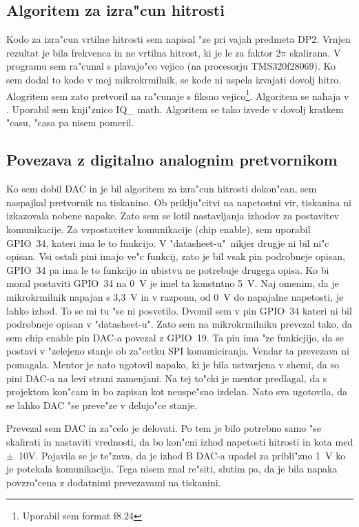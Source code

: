 \documentclass[a4paper]{article}
\begin{document}
\subsection{Algoritem za izra"cun hitrosti}  

Kodo za izra"cun vrtilne hitrosti sem napisal "ze pri vajah predmeta DP2. Vrnjen rezultat je bila frekvenca in ne vrtilna hitrost, ki je le za faktor 2$\mathrm{\pi}$ skalirana. V programu sem ra"cunal s plavajo"co vejico (na procesorju TMS320f28069). Ko sem dodal to kodo v moj mikrokrmilnik, se  kode ni uspela izvajati dovolj hitro. Alogritem sem zato pretvoril na ra"cunaje s fiksno vejico\footnote{Uporabil sem format f8.24}. Algoritem se nahaja v . Uporabil sem knji"znico IQ\_ math. Algoritem  se tako izvede v dovolj kratkem "casu, "casa pa nisem pomeril.


\subsection{Povezava z digitalno analognim pretvornikom}

Ko sem dobil DAC in je bil algoritem za  izra"cun hitrosti dokon"can, sem naspajkal pretvornik na tiskanino. Ob priklju"citvi na napetostni vir, tiskanina ni izkazovala nobene napake. Zato sem se lotil nastavljanja izhodov za postavitev komunikacije. Za vzpostavitev komunikacije (chip enable), sem uporabil GPIO~34, kateri ima le to funkcijo. V "datasheet-u"~nikjer drugje ni bil ni"c opisan. Vsi ostali pini imajo ve"c funkcij, zato je bil vsak pin podrobneje opisan, GPIO~34 pa ima le to funkcijo in ubistvu ne potrebuje drugega opisa. Ko bi moral postaviti GPIO~34 na 0~V je imel ta konstntno 5~V. Naj omenim, da je mikrokrmilnik napajan s 3,3~V in v razponu, od 0~V do napajalne napetosti, je lahko izhod. To se mi tu "se ni posvetilo. Dvomil sem v pin GPIO~34 kateri ni bil podrobneje opisan v "datasheet-u". Zato sem na mikrokrmilniku prevezal tako, da sem chip enable pin DAC-a povezal z GPIO~19. Ta pin ima "ze funkicjijo, da se postavi v "zelejeno stanje ob za"cetku SPI komuniciranja. Vendar ta prevezava ni pomagala. Mentor je nato ugotovil napako, ki je bila ustvarjena v shemi, da so pini DAC-a na levi strani zamenjani. Na tej to"cki je mentor predlagal, da s projektom kon"cam in bo zapisan kot neuspe"sno izdelan. Nato sva ugotovila, da se lahko DAC "se preve"ze v delujo"ce stanje. 

Prevezal sem DAC in za"celo je delovati. Po tem je bilo potrebno samo "se skalirati in nastaviti vrednosti, da bo kon"cni izhod napetosti hitrosti in kota med $\mathrm{\pm}$~10V. Pojavila se je te"zava, da je izhod B DAC-a upadel za pribli"zno 1~V ko je potekala komunikacija. Tega nisem znal re"siti, slutim pa, da je bila napaka povzro"cena z dodatnimi prevezavami na tiskanini.
\end{document}
